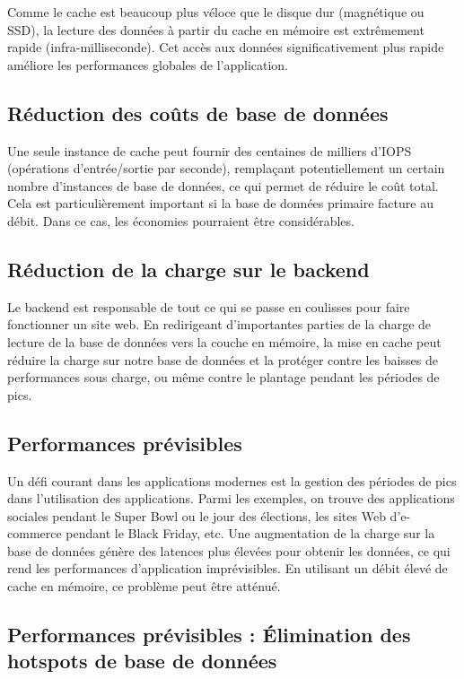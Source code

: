 \documentclass{article}
\begin{document}
Comme le cache est beaucoup plus véloce que le disque dur (magnétique ou SSD), la lecture des données à partir du cache en mémoire est extrêmement rapide (infra-milliseconde). Cet accès aux données significativement plus rapide améliore les performances globales de l'application.


\subsection{Réduction des coûts de base de données}

Une seule instance de cache peut fournir des centaines de milliers d'IOPS (opérations d'entrée/sortie par seconde), remplaçant potentiellement un certain nombre d'instances de base de données, ce qui permet de réduire le coût total. Cela est particulièrement important si la base de données primaire facture au débit. Dans ce cas, les économies pourraient être considérables.

\subsection {Réduction de la charge sur le backend}

Le backend est responsable de tout ce qui se passe en coulisses pour faire fonctionner un site web. En redirigeant d'importantes parties de la charge de lecture de la base de données vers la couche en mémoire, la mise en cache peut réduire la charge sur notre base de données et la protéger contre les baisses de performances sous charge, ou même contre le plantage pendant les périodes de pics.

\subsection {Performances prévisibles}

Un défi courant dans les applications modernes est la gestion des périodes de pics dans l'utilisation des applications. Parmi les exemples, on trouve des applications sociales pendant le Super Bowl ou le jour des élections, les sites Web d'e-commerce pendant le Black Friday, etc. Une augmentation de la charge sur la base de données génère des latences plus élevées pour obtenir les données, ce qui rend les performances d'application imprévisibles. En utilisant un débit élevé de cache en mémoire, ce problème peut être atténué.

\subsection{Performances prévisibles : Élimination des hotspots de base de données}
\end{document}
